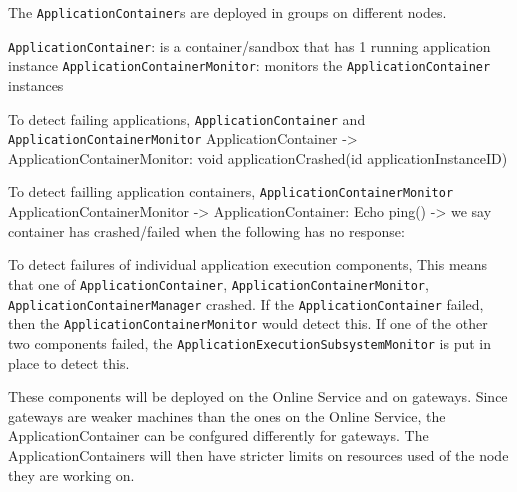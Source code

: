         The \texttt{ApplicationContainer}s are deployed in groups on different nodes.

        \texttt{ApplicationContainer}: is a container/sandbox that has 1 running application instance
        \texttt{ApplicationContainerMonitor}: monitors the \texttt{ApplicationContainer} instances

        To detect failing applications, \texttt{ApplicationContainer} and \texttt{ApplicationContainerMonitor}
            ApplicationContainer -> ApplicationContainerMonitor: void applicationCrashed(id applicationInstanceID)

        To detect failling application containers, \texttt{ApplicationContainerMonitor}
            ApplicationContainerMonitor -> ApplicationContainer: Echo ping()
            -> we say container has crashed/failed when the following has no response:

        To detect failures of individual application execution components,
        This means that one of \texttt{ApplicationContainer}, \texttt{ApplicationContainerMonitor}, \texttt{ApplicationContainerManager} crashed.
        If the \texttt{ApplicationContainer} failed, then the \texttt{ApplicationContainerMonitor} would detect this.
        If one of the other two components failed, the \texttt{ApplicationExecutionSubsystemMonitor} is put in place to detect this.

        These components will be deployed on the Online Service and on gateways.
        Since gateways are weaker machines than the ones on the Online Service,
        the ApplicationContainer can be confgured differently for gateways.
        The ApplicationContainers will then have stricter limits on
        resources used of the node they are working on.



